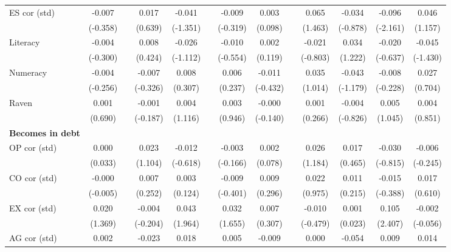 \begin{table}[htbp]
{\begin{tabular}{lcccccccccccc}
    ES cor (std) & -0.007 &       & 0.017 & -0.041 &       & -0.009 & 0.003 &       & 0.065 & -0.034 & -0.096 & 0.046 \\
          & (-0.358) &       & (0.639) & (-1.351) &       & (-0.319) & (0.098) &       & (1.463) & (-0.878) & (-2.161) & (1.157) \\
    Literacy & -0.004 &       & 0.008 & -0.026 &       & -0.010 & 0.002 &       & -0.021 & 0.034 & -0.020 & -0.045 \\
          & (-0.300) &       & (0.424) & (-1.112) &       & (-0.554) & (0.119) &       & (-0.803) & (1.222) & (-0.637) & (-1.430) \\
    Numeracy & -0.004 &       & -0.007 & 0.008 &       & 0.006 & -0.011 &       & 0.035 & -0.043 & -0.008 & 0.027 \\
          & (-0.256) &       & (-0.326) & (0.307) &       & (0.237) & (-0.432) &       & (1.014) & (-1.179) & (-0.228) & (0.704) \\
    Raven & 0.001 &       & -0.001 & 0.004 &       & 0.003 & -0.000 &       & 0.001 & -0.004 & 0.005 & 0.004 \\
          & (0.690) &       & (-0.187) & (1.116) &       & (0.946) & (-0.140) &       & (0.266) & (-0.826) & (1.045) & (0.851) \\
    \midrule
    \textbf{Becomes in debt} &       &       &       &       &       &       &       &       &       &       &       &  \\
    OP cor (std) & 0.000 &       & 0.023 & -0.012 &       & -0.003 & 0.002 &       & 0.026 & 0.017 & -0.030 & -0.006 \\
          & (0.033) &       & (1.104) & (-0.618) &       & (-0.166) & (0.078) &       & (1.184) & (0.465) & (-0.815) & (-0.245) \\
    CO cor (std) & -0.000 &       & 0.007 & 0.003 &       & -0.009 & 0.009 &       & 0.022 & 0.011 & -0.015 & 0.017 \\
          & (-0.005) &       & (0.252) & (0.124) &       & (-0.401) & (0.296) &       & (0.975) & (0.215) & (-0.388) & (0.610) \\
    EX cor (std) & 0.020 &       & -0.004 & 0.043 &       & 0.032 & 0.007 &       & -0.010 & 0.001 & 0.105 & -0.002 \\
          & (1.369) &       & (-0.204) & (1.964) &       & (1.655) & (0.307) &       & (-0.479) & (0.023) & (2.407) & (-0.056) \\
    AG cor (std) & 0.002 &       & -0.023 & 0.018 &       & 0.005 & -0.009 &       & 0.000 & -0.054 & 0.009 & 0.014 \\

\end{tabular}}
\end{table}
